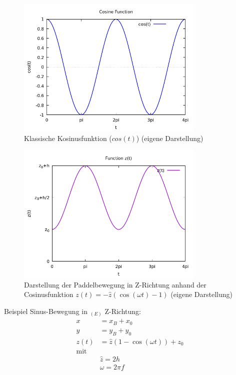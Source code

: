 \begin{figure}[h]
    \centering
    \includegraphics[width=0.8\textwidth]{bilder/cosine-plot.png}
    \caption[Kosinusfunktion]{Klassische Kosinusfunktion (\( cos(t) \)) (eigene Darstellung)}\label{fig:Kosinusfunktion}
\end{figure}
\FloatBarrier

\begin{figure}[h]
    \centering
    \includegraphics[width=0.8\textwidth]{bilder/cosine-plot_real.png}
    \caption[Darstellung der Paddelbewegung anhand der Cosinusfunktion]{Darstellung der Paddelbewegung in Z-Richtung anhand der Cosinusfunktion \( z(t) = -\hat{z}(\cos(\omega t)-1) \) (eigene Darstellung)}\label{fig:PaddelbewegungCos}
\end{figure}
\FloatBarrier



Beispiel Sinus-Bewegung in \( _{(E)}\) Z-Richtung:
\begin{equation}
    \begin{aligned}
        x &= x_B + x_0\\
        y &= y_B + y_0\\
        z(t) &= \hat{z}\left( 1 - \cos(\omega t) \right) +z_0\\
        \text{mit}\\
        &\hat{z} = 2h\\
        &\omega = 2\pi f
    \end{aligned}
\end{equation}

